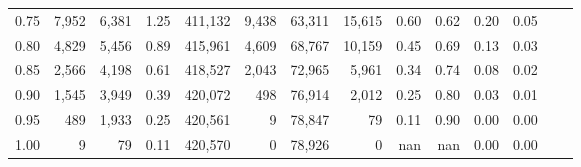 \begin{tabular}{rrrrrrrrrrrrrr}
0.75 &   7,952 &  6,381 &    1.25 &  411,132 &    9,438 &  63,311 &  15,615 &  0.60 &  0.62 &  0.20 &      0.05 \\
0.80 &   4,829 &  5,456 &    0.89 &  415,961 &    4,609 &  68,767 &  10,159 &  0.45 &  0.69 &  0.13 &      0.03 \\
0.85 &   2,566 &  4,198 &    0.61 &  418,527 &    2,043 &  72,965 &   5,961 &  0.34 &  0.74 &  0.08 &      0.02 \\
0.90 &   1,545 &  3,949 &    0.39 &  420,072 &      498 &  76,914 &   2,012 &  0.25 &  0.80 &  0.03 &      0.01 \\
0.95 &     489 &  1,933 &    0.25 &  420,561 &        9 &  78,847 &      79 &  0.11 &  0.90 &  0.00 &      0.00 \\
1.00 &       9 &     79 &    0.11 &  420,570 &        0 &  78,926 &       0 &   nan &   nan &  0.00 &      0.00 \\
\bottomrule
\end{tabular}
